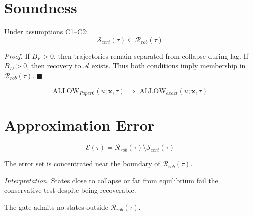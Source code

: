 \documentclass[letterpaper, 10 pt, conference]{ieeeconf}
\begin{document}
\section{Soundness}

\begin{theorem}
Under assumptions C1--C2:
\begin{equation}
\mathcal{S}_{cert}(\tau) \subseteq \mathcal{R}_{rob}(\tau)
\end{equation}
\end{theorem}

\textit{Proof.}
If $B_F > 0$, then trajectories remain separated from collapse during lag.  
If $B_D > 0$, then recovery to $\mathcal{A}$ exists.  
Thus both conditions imply membership in $\mathcal{R}_{rob}(\tau)$. \hfill $\blacksquare$

\begin{corollary}
\begin{equation}
\text{ALLOW}_{Paper6}(u;\mathbf{x},\tau)
\;\Rightarrow\;
\text{ALLOW}_{exact}(u;\mathbf{x},\tau)
\end{equation}
\end{corollary}

\section{Approximation Error}

\begin{definition}
\begin{equation}
\mathcal{E}(\tau) =
\mathcal{R}_{rob}(\tau) \setminus \mathcal{S}_{cert}(\tau)
\end{equation}
\end{definition}

\begin{proposition}
The error set is concentrated near the boundary of $\mathcal{R}_{rob}(\tau)$.
\end{proposition}

\textit{Interpretation.}
States close to collapse or far from equilibrium fail the conservative test despite being recoverable.

\begin{proposition}
The gate admits no states outside $\mathcal{R}_{rob}(\tau)$.
\end{proposition}
\end{document}
